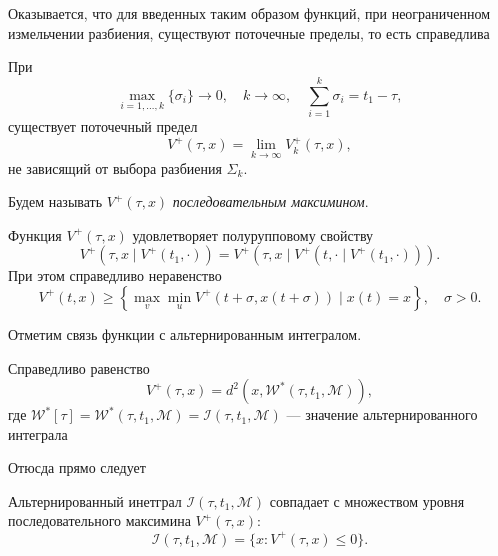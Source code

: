 Оказывается, что для введенных таким образом функций, при неограниченном измельчении разбиения,
 существуют поточечные пределы, то есть справедлива

\begin{lemma}
    При
    \begin{equation*}
        \max_{i = 1,\dots,k} \{\sigma_i\} \to 0, \quad k \to \infty, \quad \sum_{i = 1}^k \sigma_i = 
         t_1 - \tau, 
    \end{equation*}
    существует поточечный предел
    \begin{equation*}
        V^+(\tau, x) = \lim_{k \to \infty} V_k^+(\tau, x),
    \end{equation*}
    не зависящий от выбора разбиения \( \Sigma_k \).
\end{lemma}
Будем называть \( V^+(\tau, x) \) \emph{последовательным максимином}.
\begin{lemma}
    Функция \( V^+(\tau, x) \) удовлетворяет полурупповому свойству
    \[
        V^+(\tau, x \mid V^+(t_1, \cdot)) = V^+(\tau, x \mid V^+(t, \cdot \mid V^+(t_1, 
         \cdot))).  
    \]
    При этом справедливо неравенство
    \[
        V^+(t, x) \ge \left\{ \max_v \min_u V^+(t + \sigma, x(t + \sigma)) \mid x(t) = x 
         \right\}, \quad \sigma > 0.
    \]
\end{lemma}

Отметим связь функции с альтернированным интегралом.
\begin{lemma}
    Справедливо равенство
    \[
        V^+ (\tau, x) = d^2(x, \mathcal{W}^*(\tau, t_1, \mathcal{M})),
    \]
    где \( \mathcal{W}^*[\tau] = \mathcal{W}^*(\tau, t_1, \mathcal{M}) = \mathcal{I}(\tau,
     t_1, \mathcal{M}) \) --- значение альтернированного интеграла
\end{lemma}
Отюсда прямо следует
\begin{lemma}
    Альтернированный инетграл \( \mathcal{I}(\tau, t_1, \mathcal{M}) \) совпадает с
     множеством уровня последовательного максимина \( V^+(\tau, x) \):
    \[
        \mathcal{I}(\tau, t_1, \mathcal{M}) = \{ x : V^+(\tau, x) \le 0 \}.
    \]
\end{lemma}

